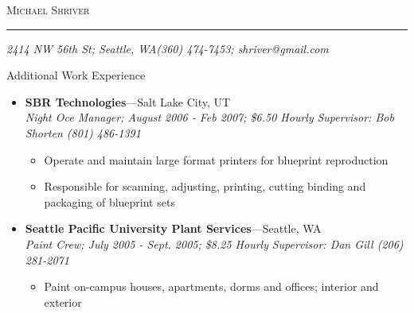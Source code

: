 \documentclass[11pt,oneside]{article}
\makeatletter
\newcommand{\name}{Michael Shriver}
\newcommand{\addr}{2414 NW 56th St; Seattle, WA}
\newcommand{\phone}{(360) 474-7453}
\newcommand{\email}{shriver@gmail.com}
\newcommand{\bigname}[1]{
    \begin{flushleft}\fontfamily{phv}\selectfont\Huge\scshape#1\end{flushleft}
}
\newenvironment{ressection}[1]{
    \vspace{4pt}
    {\fontfamily{phv}\selectfont\Large#1}
    \begin{itemize}
    \vspace{3pt}
}{
    \end{itemize}
}
\newcommand{\ressubitem}[1]{
    \vspace{-1pt}
    \item \begin{flushleft} #1 \end{flushleft}
}
\newenvironment{ressubsec}[4]{
    \item
    \textbf{#1}---#2 \\
    \textit{#3}
    \newline
    \textit{#4}
    \vspace{-2pt}
    \begin{itemize}
}{
    \end{itemize}
}
\makeatother
\begin{document}
 \selectfont

\bigname{\name}
\vspace{-8pt} \rule{\textwidth}{1pt}

\vspace{-1pt} {\small\itshape \addr \hfill \phone; \email}

\vspace{8 pt}


\begin{ressection}{Additional Work Experience}


    \begin{ressubsec}{SBR Technologies}{Salt Lake City, UT}{Night Oce Manager; August 2006 - Feb 2007; \$6.50 Hourly}{Supervisor: Bob Shorten (801) 486-1391}
        \ressubitem{Operate and maintain large format printers for blueprint reproduction}
        \ressubitem{Responsible for scanning, adjusting, printing, cutting binding and packaging of blueprint sets}
    \end{ressubsec}

    \begin{ressubsec}{Seattle Pacific University Plant Services}{Seattle, WA}{Paint Crew; July 2005 - Sept. 2005; \$8.25 Hourly}{Supervisor: Dan Gill (206) 281-2071}
        \ressubitem{Paint on-campus houses, apartments, dorms and offices; interior and exterior}
    \end{ressubsec}



\end{ressection}
\end{document}
